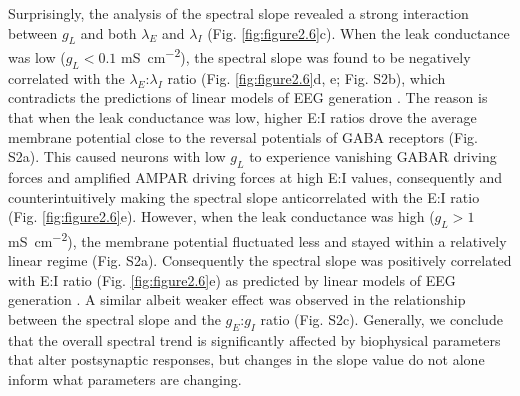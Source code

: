 Surprisingly, the analysis of the spectral slope revealed a strong interaction between $g_L$ and both $\lambda_E$ and $\lambda_I$ (Fig. \ref{fig:figure2.6}c). When the leak conductance was low ($g_L<0.1$ \unit{\milli\siemens\per\centi\meter\squared}), the spectral slope was found to be negatively correlated with the $\lambda_E$:$\lambda_I$ ratio (Fig. \ref{fig:figure2.6}d, e; Fig. S2b), which contradicts the predictions of linear models of EEG generation \cite{Gao2017}. The reason is that when the leak conductance was low, higher E:I ratios drove the average membrane potential close to the reversal potentials of GABA receptors (Fig. S2a). This caused neurons with low $g_L$ to experience vanishing GABAR driving forces and amplified AMPAR driving forces at high E:I values, consequently and counterintuitively making the spectral slope anticorrelated with the E:I ratio (Fig. \ref{fig:figure2.6}e). However, when the leak conductance was high ($g_L>1$ \unit{\milli\siemens\per\centi\meter\squared}), the membrane potential fluctuated less and stayed within a relatively linear regime (Fig. S2a). Consequently the spectral slope was positively correlated with E:I ratio (Fig. \ref{fig:figure2.6}e) as predicted by linear models of EEG generation \cite{Gao2017}. A similar albeit weaker effect was observed in the relationship between the spectral slope and the $g_E$:$g_I$ ratio (Fig. S2c). Generally, we conclude that the overall spectral trend is significantly affected by biophysical parameters that alter postsynaptic responses, but changes in the slope value do not alone inform what parameters are changing.


